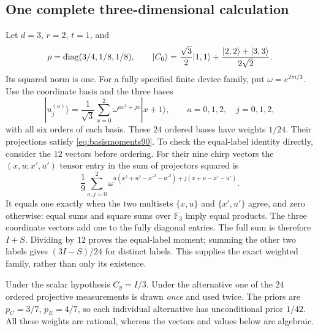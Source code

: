 \subsection{One complete three-dimensional calculation}
Let $d=3$, $r=2$, $t=1$, and
\[
 \rho=\operatorname{diag}(3/4,1/8,1/8),\qquad
 |C_0\rangle=\frac{\sqrt3}{2}|1,1\rangle+
            \frac{|2,2\rangle+|3,3\rangle}{2\sqrt2}.
\]
Its squared norm is one.  For a fully specified finite device family,
put $\omega=e^{2\pi i/3}$.  Use the coordinate basis and the three
bases
\[
 |u_j^{(a)}\rangle=\frac1{\sqrt3}
       \sum_{x=0}^2\omega^{a x^2+jx}|x+1\rangle,
       \qquad a=0,1,2,\quad j=0,1,2,
\]
with all six orders of each basis.  These $24$ ordered bases have
weights $1/24$.  Their projections satisfy
\eqref{eq:basismoments90}.  To check the equal-label identity directly,
consider the $12$ vectors before ordering.  For their nine chirp
vectors the $(x,u;x',u')$ tensor entry in the sum of projectors
squared is
\[
 \frac19\sum_{a,j=0}^2
   \omega^{a(x^2+u^2-x'^2-u'^2)+j(x+u-x'-u')}.
\]
It equals one exactly when the two multisets $\{x,u\}$ and
$\{x',u'\}$ agree, and zero otherwise: equal sums and square sums
over $\mathbb F_3$ imply equal products.  The three coordinate
vectors add one to the fully diagonal entries.  The full sum is
therefore $I+S$.  Dividing by $12$ proves the equal-label moment;
summing the other two labels gives $(3I-S)/24$ for distinct labels.
This supplies the exact weighted family, rather than only its existence.

Under the scalar hypothesis $C_y=I/3$.  Under the alternative one of
the $24$ ordered projective measurements is drawn \emph{once} and
used twice.  The priors are $p_C=3/7$, $p_E=4/7$, so each individual
alternative has unconditional prior $1/42$.  All these weights are
rational, whereas the vectors and values below are algebraic.

